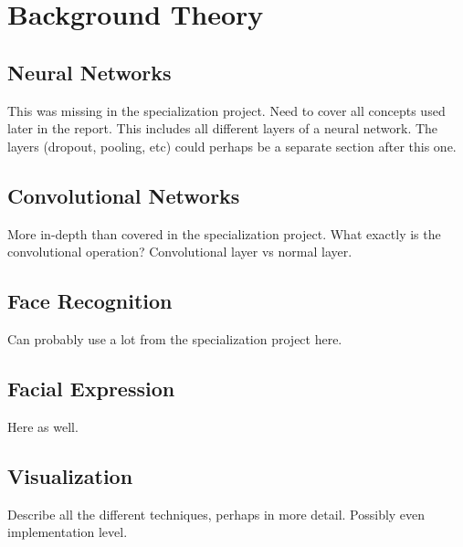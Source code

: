 
\chapter{Background Theory}

\section{Neural Networks}

This was missing in the specialization project. Need to cover all concepts used later in the report. This includes all different layers of a neural network. The layers (dropout, pooling, etc) could perhaps be a separate section after this one.

\section{Convolutional Networks}

More in-depth than covered in the specialization project. 
What exactly is the convolutional operation? Convolutional layer vs normal layer.

\section{Face Recognition}

Can probably use a lot from the specialization project here.

\section{Facial Expression}

Here as well.

\section{Visualization}

Describe all the different techniques, perhaps in more detail.
Possibly even implementation level.

\cleardoublepage